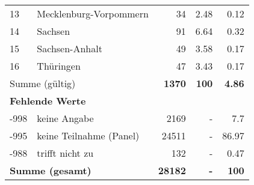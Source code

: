 \begin{longtable}{lXrrr}
     13 &
     \multicolumn{1}{X}{ Mecklenburg-Vorpommern   } &


       \num{34} &
       \num[round-mode=places,round-precision=2]{2.48} &
         \num[round-mode=places,round-precision=2]{0.12} \\

     14 &
     \multicolumn{1}{X}{ Sachsen   } &


       \num{91} &
       \num[round-mode=places,round-precision=2]{6.64} &
         \num[round-mode=places,round-precision=2]{0.32} \\

     15 &
     \multicolumn{1}{X}{ Sachsen-Anhalt   } &


       \num{49} &
       \num[round-mode=places,round-precision=2]{3.58} &
         \num[round-mode=places,round-precision=2]{0.17} \\

     16 &
     \multicolumn{1}{X}{ Thüringen   } &


       \num{47} &
       \num[round-mode=places,round-precision=2]{3.43} &
         \num[round-mode=places,round-precision=2]{0.17} \\
     \midrule
     \multicolumn{2}{l}{Summe (gültig)} &
       \textbf{\num{1370}} &
     \textbf{100} &
       \textbf{\num[round-mode=places,round-precision=2]{4.86}} \\
     \multicolumn{5}{l}{\textbf{Fehlende Werte}}\\
       -998 &
       keine Angabe &
         \num{2169} &
        - &
         \num[round-mode=places,round-precision=2]{7.7} \\
       -995 &
       keine Teilnahme (Panel) &
         \num{24511} &
        - &
         \num[round-mode=places,round-precision=2]{86.97} \\
       -988 &
       trifft nicht zu &
         \num{132} &
        - &
         \num[round-mode=places,round-precision=2]{0.47} \\
     \midrule
     \multicolumn{2}{l}{\textbf{Summe (gesamt)}} &
          \textbf{\num{28182}} &
        \textbf{-} &
        \textbf{100} \\
     \bottomrule
     \end{longtable}
     
